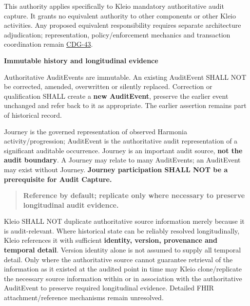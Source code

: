 This authority applies specifically to Kleio mandatory authoritative audit
capture. It grants no equivalent authority to other components or other Kleio
activities. Any proposed equivalent responsibility requires separate architecture
adjudication; representation, policy/enforcement mechanics and transaction
coordination remain \href{\detokenize{../../../../../docs/markdown/05-information-systems-architecture/gaps.md#kleio-detailed-contracts}}{CDG-43}.







\par\medskip\textbf{Immutable history and longitudinal evidence}\par


Authoritative AuditEvents are immutable. An existing AuditEvent SHALL NOT be
corrected, amended, overwritten or silently replaced. Correction or qualification
SHALL create a \textbf{new AuditEvent}, preserve the earlier event unchanged and refer
back to it as appropriate. The earlier assertion remains part of historical record.



Journey is the governed representation of observed Harmonia activity/progression;
AuditEvent is the authoritative audit representation of a significant auditable
occurrence. Journey is an important audit source, \textbf{not the audit boundary}.
A Journey may relate to many AuditEvents; an AuditEvent may exist without Journey.
\textbf{Journey participation SHALL NOT be a prerequisite for Audit Capture.}



\begin{quote}


\textbf{Reference by default; replicate only where necessary to preserve longitudinal
audit evidence.}



\end{quote}


Kleio SHALL NOT duplicate authoritative source information merely because it is
audit-relevant. Where historical state can be reliably resolved longitudinally,
Kleio references it with sufficient \textbf{identity, version, provenance and temporal
detail}. Version identity alone is not assumed to supply all temporal detail.
Only where the authoritative source cannot guarantee retrieval of the information
as it existed at the audited point in time may Kleio clone/replicate the necessary
source information within or in association with the authoritative AuditEvent to
preserve required longitudinal evidence. Detailed FHIR attachment/reference
mechanisms remain unresolved.







